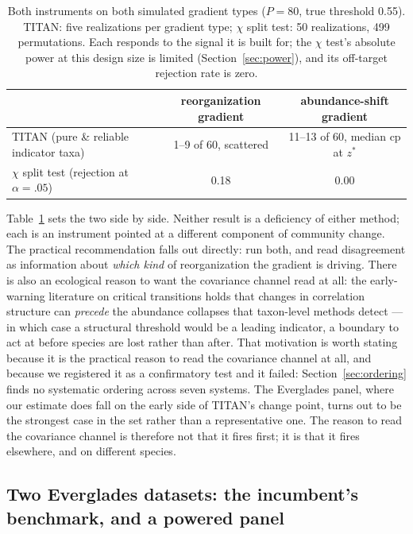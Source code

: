 \documentclass[review,12pt,authoryear]{elsarticle}
\theoremstyle{remark}
\begin{document}
\begin{table}[t]
\centering
\caption{Both instruments on both simulated gradient types ($P=80$, true
threshold 0.55). TITAN: five realizations per gradient type; $\chi$ split
test: 50 realizations, 499 permutations. Each responds to the signal it is
built for; the $\chi$ test's absolute power at this design size is limited
(Section~\ref{sec:power}), and its off-target rejection rate is zero.}
\label{tab:complement}
\begin{tabular}{lcc}
\toprule
 & reorganization gradient & abundance-shift gradient \\
\midrule
TITAN (pure \& reliable indicator taxa)
  & 1--9 of 60, scattered & 11--13 of 60, median cp at $z^\ast$ \\
$\chi$ split test (rejection at $\alpha=.05$) & 0.18 & 0.00 \\
\bottomrule
\end{tabular}
\end{table}

Table~\ref{tab:complement} sets the two side by side. Neither result is a
deficiency of either method; each is an instrument pointed at a different
component of community change. The practical recommendation
falls out directly: run both, and read disagreement as information about
\emph{which kind} of reorganization the gradient is driving. There is also
an ecological reason to want the covariance channel read at all: the
early-warning literature on critical transitions holds that changes in
correlation structure can \emph{precede} the abundance collapses that
taxon-level methods detect \citep{scheffer2009ews}---in which case a
structural threshold would be a leading indicator, a boundary to act at
before species are lost rather than after. That motivation is worth stating
because it is the practical reason to read the covariance channel at all,
and because we registered it as a confirmatory test and it failed:
Section~\ref{sec:ordering} finds no systematic ordering across seven
systems. The Everglades panel, where our estimate does fall on the early
side of TITAN's change point, turns out to be the strongest case in the set
rather than a representative one. The reason to read the covariance channel
is therefore not that it fires first; it is that it fires elsewhere, and on
different species.

\subsection{Two Everglades datasets: the incumbent's benchmark, and a powered panel}
\label{sec:public}
\end{document}
